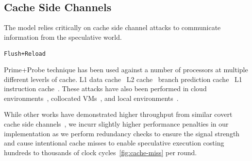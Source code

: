 \subsection{Cache Side Channels}

The \speculake model relies critically on cache side channel attacks to 
communicate information from the speculative world.

\texttt{Flush+Reload}~\cite{yarom2014flush+}


Prime+Probe technique has been used against a number of processors
at multiple different leverls of cache. L1 data cache~\cite{} 
L2 cache~\cite{}
branch prediction cache~\cite{}
L1 instruction cache~\cite{}. These attacks have also been performed 
in cloud environments~\cite{}, collocated VMs~\cite{}, and local
environments~\cite{}.  

While other works have demonstrated higher throughput from similar 
covert cache side channels~\cite{}, we incurr slightly higher performance 
penalties in our implementation as we perform redundancy checks to 
ensure the signal strength and cause intentional cache misses to enable
speculative execution costing hundreds to thousands of clock cycles~\ref{fig:cache-miss}
per round. 



